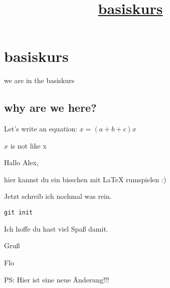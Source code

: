 \documentclass[11pt]{scrartcl}
\begin{document}
\title{\underline{basiskurs}}
\maketitle
\section{basiskurs}
we are in the basiskurs
\subsection{why are we here?}
Let's write an equation: $x = (a + b + c) x$

$x$ is not like x


Hallo Alex,

hier kannst du ein bisschen mit LaTeX rumspielen :)

Jetzt schreib ich nochmal was rein.

\lstset{language=Bash}
\begin{lstlisting}
git init
\end{lstlisting}
Ich hoffe du hast viel Spaß damit.

Gruß

Flo 
 
PS: Hier ist eine neue Änderung!!!
\end{document}
